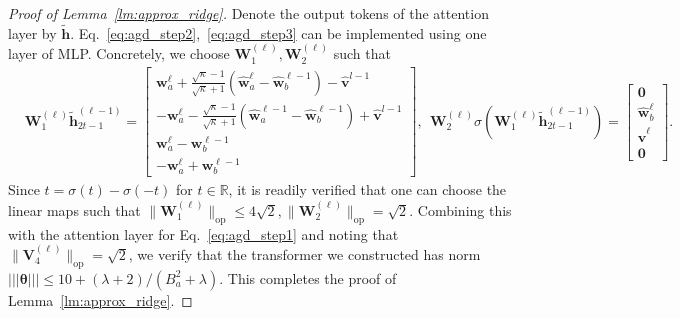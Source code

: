 \documentclass[10pt]{article}
\renewcommand{\hat}{\widehat}
\newcommand{\lops}[1]{\|{#1}\|_{\mathrm{op}}}
\newcommand{\<}{\left\langle}
\renewcommand{\>}{\right\rangle}
\newcommand{\lth}{{(\ell)}}
\newcommand{\bzero}{{\mathbf 0}}
\newcommand{\nrmp}[1]{{\left|\!\left|\!\left|{#1}\right|\!\right|\!\right|}}
\newcommand{\R}{\mathbb{R}}
\def\bV{{\mathbf V}}
\def\bW{{\mathbf W}}
\def\btheta{{\boldsymbol \theta}}
\def\bh{{\mathbf h}}
\def\bv{{\mathbf v}}
\def\bw{{\mathbf w}}
\begin{document}
\begin{proof}[Proof of Lemma~\ref{lm:approx_ridge}]
Denote the output tokens of the attention layer by $\tilde \bh$. Eq.~\eqref{eq:agd_step2},~\eqref{eq:agd_step3} can be implemented using one layer of MLP. Concretely, we choose $\bW_{1}^\lth,\bW_{2}^\lth$ such that
\begin{align*}
     &\bW_1^{(\ell)}\tilde\bh^{(\ell-1)}_{2t-1}=\begin{bmatrix}
        \bw^{\ell}_a+\frac{\sqrt{\kappa}-1}{\sqrt{\kappa}+1}(\hat\bw^{\ell}_a-\hat\bw^{\ell-1}_b)-\hat\bv^{l-1}
        \\
        -\bw^{\ell}_a-\frac{\sqrt{\kappa}-1}{\sqrt{\kappa}+1}(\hat\bw^{\ell-1}_a-\hat\bw^{\ell-1}_b)+\hat\bv^{l-1}
        \\
        \bw^{\ell}_a- \bw^{\ell-1}_b
        \\
        -\bw^{\ell}_a+\bw^{\ell-1}_b
    \end{bmatrix},~~ \bW_2^{(\ell)}\sigma(\bW_1^{(\ell)}\tilde\bh^{(\ell-1)}_{2t-1})=\begin{bmatrix}
      \bzero\\  \hat\bw^{\ell}_b \\ \hat\bv^\ell\\\bzero
    \end{bmatrix}.
\end{align*} Since $t=\sigma(t)-\sigma(-t)$ for $t\in\R$,  it is readily verified that one can choose the linear maps such that $\lops{\bW_1^\lth}\leq 4\sqrt{2},\lops{\bW_2^\lth}=\sqrt{2}$. Combining this with the attention layer for Eq.~\eqref{eq:agd_step1} and noting that $\lops{\bV_4^\lth}=\sqrt{2}$, we verify that the  transformer we constructed has norm $\nrmp{\btheta}\leq 10+(\lambda+2)/(B_a^2+\lambda)$. This completes the proof of Lemma~\ref{lm:approx_ridge}.
\end{proof}
\end{document}
